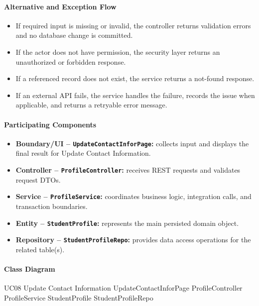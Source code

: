 \paragraph{Alternative and Exception Flow}

\begin{itemize}
    \item If required input is missing or invalid, the controller returns validation errors and no database change is committed.
    \item If the actor does not have permission, the security layer returns an unauthorized or forbidden response.
    \item If a referenced record does not exist, the service returns a not-found response.
    \item If an external API fails, the service handles the failure, records the issue when applicable, and returns a retryable error message.
\end{itemize}

\paragraph{Participating Components}

\begin{itemize}
    \item \textbf{Boundary/UI -- \texttt{UpdateContactInforPage}:} collects input and displays the final result for Update Contact Information.
    \item \textbf{Controller -- \texttt{ProfileController}:} receives REST requests and validates request DTOs.
    \item \textbf{Service -- \texttt{ProfileService}:} coordinates business logic, integration calls, and transaction boundaries.
    \item \textbf{Entity -- \texttt{StudentProfile}:} represents the main persisted domain object.
    \item \textbf{Repository -- \texttt{StudentProfileRepo}:} provides data access operations for the related table(s).
\end{itemize}

\paragraph{Class Diagram}

\ClassDiagram
{UC08 Update Contact Information}
{UpdateContactInforPage}
{ProfileController}
{ProfileService}
{StudentProfile}
{StudentProfileRepo}

